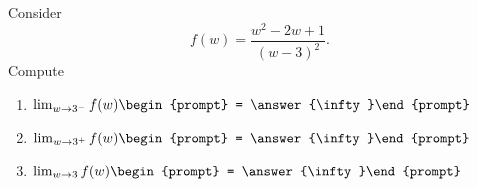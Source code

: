 \documentclass{ximera}
\author{Bart Snapp}
\begin{document}
\begin{exercise}
Consider 
\[
f(w) = \frac{w^2-2 w+1}{(w-3)^2}.
\]
Compute
\begin{enumerate}
\item $\lim_{w\to 3^- } f(w) \begin{prompt} = \answer{\infty}\end{prompt}$
\item $\lim_{w\to 3^+ } f(w) \begin{prompt} = \answer{\infty}\end{prompt}$
\item $\lim_{w\to 3 } f(w) \begin{prompt} = \answer{\infty}\end{prompt}$
\end{enumerate}
\end{exercise}
\end{document}
